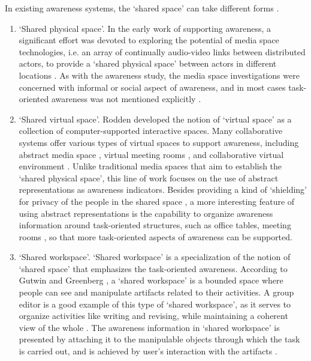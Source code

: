 In existing awareness systems, the `shared space' can take different forms \cite{antunes2010a}. 
\begin{enumerate}
   \item `Shared physical space'. In the early work of supporting awareness, a significant effort was devoted to exploring the potential of media space technologies, i.e. an array of continually audio-video links between distributed actors, to provide a `shared physical space' between actors in different locations \cite{Dourish1992}. As with the awareness study, the media space investigations were concerned with informal or social aspect of awareness, and in most cases task-oriented awareness was not mentioned explicitly \cite{schmidt2002a}.
   \item `Shared virtual space'. Rodden \cite{Rodden1996} developed the notion of `virtual space' as a collection of computer-supported interactive spaces. Many collaborative systems offer various types of virtual spaces to support awareness, including abstract media space \cite{Pedersen1997}, virtual meeting rooms \cite{Berlage1999}, and collaborative virtual environment \cite{Benford2001}. Unlike traditional media spaces that aim to establish the `shared physical space', this line of work focuses on the use of abstract representations as awareness indicators. Besides providing a kind of `shielding' for privacy of the people in the shared space \cite{Pedersen1997}, a more interesting feature of using abstract representations is the capability to organize awareness information around task-oriented structures, such as office tables, meeting rooms \cite{Berlage1999}, so that more task-oriented aspects of awareness can be supported.
   \item `Shared workspace'. `Shared workspace' is a specialization of the notion of `shared space' that emphasizes the task-oriented awareness. According to Gutwin and Greenberg \cite{Gutwin2002}, a `shared workspace' is a bounded space where people can see and manipulate artifacts related to their activities. A group editor is a good example of this type of `shared workspace', as it serves to organize activities like writing and revising, while maintaining a coherent view of the whole \cite{dourish1992awareness}. The awareness information in `shared workspace' is presented by attaching it to the manipulable objects through which the task is carried out, and is achieved by user's interaction with the artifacts \cite{Gutwin2002}.
\end{enumerate}

